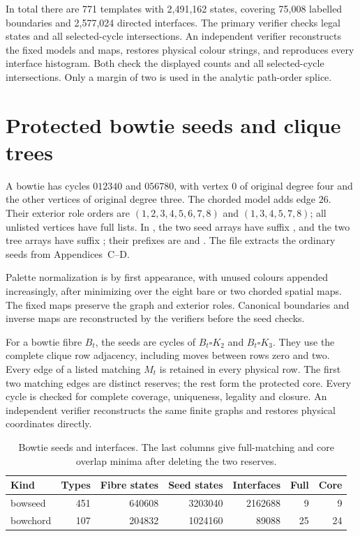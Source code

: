 \documentclass[11pt]{article}
\numberwithin{equation}{section}
\numberwithin{table}{section}
\begin{document}
In total there are 771 templates with 2,491,162 states, covering
75,008 labelled boundaries and 2,577,024 directed interfaces.
The primary verifier checks legal states and all selected-cycle
intersections. An independent verifier reconstructs the fixed models and
maps, restores physical colour strings, and reproduces every interface
histogram. Both check the displayed counts and all selected-cycle
intersections.
Only a margin of two is used in the analytic path-order splice.

\clearpage
\section{Protected bowtie seeds and clique trees}
\label{app:bowtie-certificates}
A bowtie has cycles $012340$ and $056780$, with vertex $0$ of
original degree four and the other vertices of original degree three.
The chorded model adds edge $26$. Their exterior role orders are
$(1,2,3,4,5,6,7,8)$ and $(1,3,4,5,7,8)$; all unlisted vertices
have full lists. In , the two seed arrays have
suffix , and the two tree arrays have suffix
; their prefixes are  and
. The file 
extracts the ordinary seeds from
Appendices~C--D.

Palette normalization is by first appearance, with unused colours
appended increasingly, after minimizing over the eight bare or two
chorded spatial maps. The fixed maps preserve the graph and exterior
roles. Canonical boundaries and inverse maps are reconstructed by the
verifiers before the seed checks.

For a bowtie fibre $B_t$, the seeds are cycles of
$B_t\square K_2$ and $B_t\square K_3$. They use the complete clique
row adjacency, including moves between rows zero and two. Every edge
of a listed matching $M_t$ is retained in every physical row.
The first two matching edges are distinct reserves; the rest form
the protected core. Every cycle is checked for complete coverage,
uniqueness, legality and closure. An independent verifier reconstructs the
same finite graphs and restores physical coordinates directly.

\begin{table}[htbp]
\centering\small
\caption{Bowtie seeds and interfaces. The last columns give full-matching
and core overlap minima after deleting the two reserves.}
\label{tab:bowtie-counts}
\begin{tabular}{lrrrrrr}
\toprule
Kind & Types & Fibre states & Seed states & Interfaces & Full & Core\\
\midrule
bowseed&451&640608&3203040&2162688&9&9\\
bowchord&107&204832&1024160&89088&25&24\\
\bottomrule
\end{tabular}
\end{table}
\end{document}
